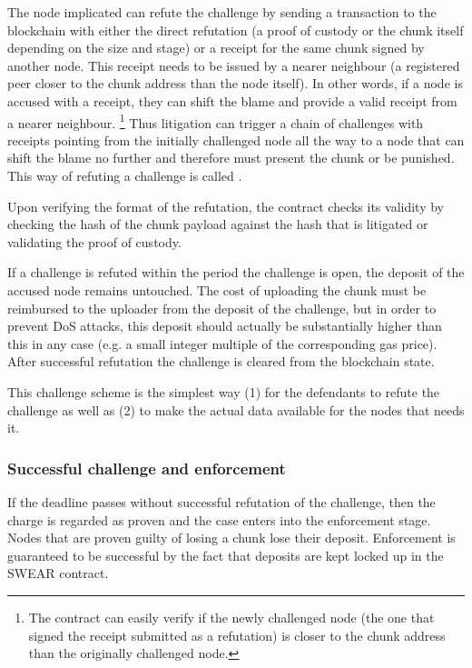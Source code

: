 The node implicated can refute the challenge by sending a transaction to the blockchain with either the direct refutation (a proof of custody or the chunk itself depending on the size and stage) or a receipt for the same chunk signed by another node. This receipt needs to be issued by a nearer neighbour (a registered peer closer to the chunk address than the node itself). In other words, if a node is accused with a receipt, they can  shift the blame and provide a valid receipt from a nearer neighbour.%
%
\footnote{The contract can easily verify if the newly challenged node (the one that signed the receipt submitted as a refutation) is closer to the chunk address than the originally challenged node.}
%
Thus litigation can trigger a chain of challenges with receipts pointing from the initially challenged node all the way to a node that can shift the blame no further and therefore must present the chunk or be punished. This way of refuting a challenge is called . 

Upon verifying the format of the refutation, the contract checks its validity by checking the hash of the chunk payload against the hash that is litigated or validating the proof of custody. 

If a challenge is refuted within the period the challenge is open, the deposit of the accused node remains untouched. The cost of uploading the chunk must be reimbursed to the uploader from the deposit of the challenge, but in order to prevent DoS attacks, this deposit should actually be substantially higher than this in any case (e.g. a small integer multiple of the corresponding gas price). After successful refutation the challenge is cleared from the blockchain state.

This challenge scheme is the simplest way (1) for the defendants to refute the challenge as well as (2) to make the actual data available for the nodes that needs it.

\subsubsection{Successful challenge and enforcement}

If the deadline passes without successful refutation of the challenge, then the charge is regarded as proven and the case enters into the enforcement stage. Nodes that are proven guilty of losing a chunk lose their deposit. Enforcement is guaranteed to be successful by the fact that deposits are kept locked up in the SWEAR contract.

